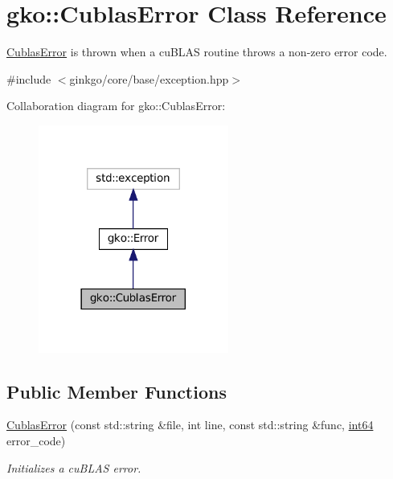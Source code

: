 \hypertarget{classgko_1_1CublasError}{}\section{gko\+:\+:Cublas\+Error Class Reference}
\label{classgko_1_1CublasError}


\hyperlink{classgko_1_1CublasError}{Cublas\+Error} is thrown when a cu\+B\+L\+AS routine throws a non-\/zero error code.  




{\ttfamily \#include $<$ginkgo/core/base/exception.\+hpp$>$}



Collaboration diagram for gko\+:\+:Cublas\+Error\+:
\nopagebreak
\begin{figure}[H]
\begin{center}
\leavevmode
\includegraphics[width=177pt]{classgko_1_1CublasError__coll__graph}
\end{center}
\end{figure}
\subsection*{Public Member Functions}
\begin{DoxyCompactItemize}
\item 
\hyperlink{classgko_1_1CublasError_a4f16cd8a9189da444d11a97337a56d8f}{Cublas\+Error} (const std\+::string \&file, int line, const std\+::string \&func, \hyperlink{namespacegko_a6c57dbf3168b1ecad3ea133aaf2efbc1}{int64} error\+\_\+code)
\begin{DoxyCompactList}\small\item\em Initializes a cu\+B\+L\+AS error. \end{DoxyCompactList}\end{DoxyCompactItemize}


